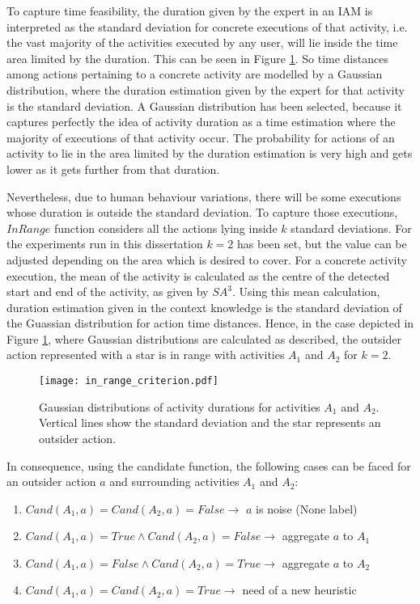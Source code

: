 To capture time feasibility, the duration given by the expert in an IAM is interpreted as the standard deviation for concrete executions of that activity, i.e. the vast majority of the activities executed by any user, will lie inside the time area limited by the duration. This can be seen in Figure \ref{fig-in-range}. So time distances among actions pertaining to a concrete activity are modelled by a Gaussian distribution, where the duration estimation given by the expert for that activity is the standard deviation. A Gaussian distribution has been selected, because it captures perfectly the idea of activity duration as a time estimation where the majority of executions of that activity occur. The probability for actions of an activity to lie in the area limited by the duration estimation is very high and gets lower as it gets further from that duration.

Nevertheless, due to human behaviour variations, there will be some executions whose duration is outside the standard deviation. To capture those executions, $InRange$ function considers all the actions lying inside $k$ standard deviations. For the experiments run in this dissertation $k=2$ has been set, but the value can be adjusted depending on the area which is desired to cover. For a concrete activity execution, the mean of the activity is calculated as the centre of the detected start and end of the activity, as given by $SA^3$. Using this mean calculation, duration estimation given in the context knowledge is the standard deviation of the Guassian distribution for action time distances. Hence, in the case depicted in Figure \ref{fig-in-range}, where Gaussian distributions are calculated as described, the outsider action represented with a star is in range with activities $A_1$ and $A_2$ for $k=2$.

\begin{figure}[!t]
\centering
\texttt{[image: in\_range\_criterion.pdf]}
    \caption{Gaussian distributions of activity durations for activities $A_1$ and $A_2$. Vertical lines show the standard deviation and the star represents an outsider action.}
    \label{fig-in-range}
\end{figure}

In consequence, using the candidate function, the following cases can be faced for an outsider action $a$ and surrounding activities $A_1$ and $A_2$:

\begin{enumerate}
 \item $Cand(A_1, a) = Cand(A_2, a) = False \rightarrow$ $a$ is noise (None label)
 \item $Cand(A_1, a) = True \wedge Cand(A_2, a) = False \rightarrow$ aggregate $a$ to $A_1$
 \item $Cand(A_1, a) = False \wedge Cand(A_2, a) = True \rightarrow$ aggregate $a$ to $A_2$
 \item $Cand(A_1, a) = Cand(A_2, a) = True \rightarrow$ need of a new heuristic
\end{enumerate}

